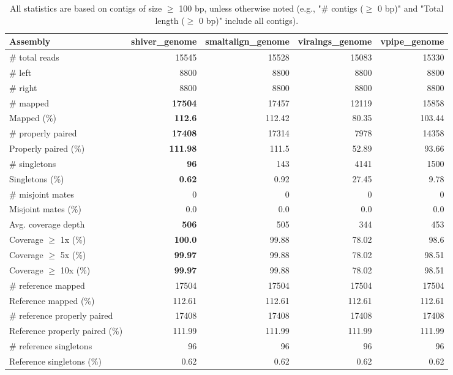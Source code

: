 \documentclass[12pt,a4paper]{article}
\begin{document}
\begin{table}[ht]
\begin{center}
\caption{All statistics are based on contigs of size $\geq$ 100 bp, unless otherwise noted (e.g., "\# contigs ($\geq$ 0 bp)" and "Total length ($\geq$ 0 bp)" include all contigs).}
\begin{tabular}{|l*{4}{|r}|}
\hline
Assembly & shiver\_genome & smaltalign\_genome & viralngs\_genome & vpipe\_genome \\ \hline
\# total reads & 15545 & 15528 & 15083 & 15330 \\ \hline
\# left & 8800 & 8800 & 8800 & 8800 \\ \hline
\# right & 8800 & 8800 & 8800 & 8800 \\ \hline
\# mapped & {\bf 17504} & 17457 & 12119 & 15858 \\ \hline
Mapped (\%) & {\bf 112.6} & 112.42 & 80.35 & 103.44 \\ \hline
\# properly paired & {\bf 17408} & 17314 & 7978 & 14358 \\ \hline
Properly paired (\%) & {\bf 111.98} & 111.5 & 52.89 & 93.66 \\ \hline
\# singletons & {\bf 96} & 143 & 4141 & 1500 \\ \hline
Singletons (\%) & {\bf 0.62} & 0.92 & 27.45 & 9.78 \\ \hline
\# misjoint mates & 0 & 0 & 0 & 0 \\ \hline
Misjoint mates (\%) & 0.0 & 0.0 & 0.0 & 0.0 \\ \hline
Avg. coverage depth & {\bf 506} & 505 & 344 & 453 \\ \hline
Coverage $\geq$ 1x (\%) & {\bf 100.0} & 99.88 & 78.02 & 98.6 \\ \hline
Coverage $\geq$ 5x (\%) & {\bf 99.97} & 99.88 & 78.02 & 98.51 \\ \hline
Coverage $\geq$ 10x (\%) & {\bf 99.97} & 99.88 & 78.02 & 98.51 \\ \hline
\# reference mapped & 17504 & 17504 & 17504 & 17504 \\ \hline
Reference mapped (\%) & 112.61 & 112.61 & 112.61 & 112.61 \\ \hline
\# reference properly paired & 17408 & 17408 & 17408 & 17408 \\ \hline
Reference properly paired (\%) & 111.99 & 111.99 & 111.99 & 111.99 \\ \hline
\# reference singletons & 96 & 96 & 96 & 96 \\ \hline
Reference singletons (\%) & 0.62 & 0.62 & 0.62 & 0.62 \\ \hline

\end{tabular}
\end{center}
\end{table}
\end{document}
